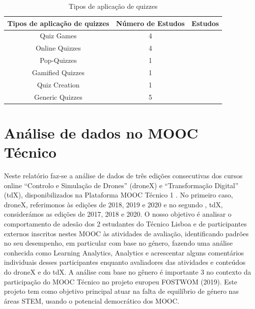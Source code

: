 \begin{table}[ht]
    \centering
        \caption{Tipos de aplicação de quizzes}
        \begin{tabular}{c|c|c}
            \hline
                \textbf{Tipos de aplicação de quizzes} & \textbf{Número de Estudos}  & \textbf{Estudos} \\
            \hline
            \hline
                Quiz Games & 
                4 &
                \cite{petri_quality_2017, petri_games_2018, verdu_distributed_2012, wu_improvement_2011} \\
            \hline
                Online Quizzes & 
                4 & 
                \cite{figueiredo_evaluation_2014, coore_facilitating_2019, luxton-reilly_introductory_2018, krugel_computational_2017} \\
            \hline
                Pop-Quizzes & 
                1 &
                \cite{luxton-reilly_introductory_2018} \\
            \hline
                Gamified Quizzes & 
                1 & 
                \cite{luxton-reilly_introductory_2018} \\
            \hline
                Quiz Creation & 
                1 & 
                \cite{ogawa_evaluation_2018} \\
            \hline
                Generic Quizzes & 
                5 & 
                \cite{crow_intelligent_2018, ogawa_evaluation_2018, acharya_infusing_2017, thevathayan_imparting_2017, herold_student_2012} \\
            \hline
        \end{tabular}
    \label{tab:quizzes_application_types}
\end{table}



\section{Análise de dados no MOOC Técnico}

Neste relatório faz-se a análise de dados de três edições consecutivas dos cursos online “Controlo e Simulação de Drones” (droneX) e “Transformação Digital” (tdX), disponibilizados na Plataforma MOOC Técnico 1 . No primeiro caso, droneX, referimonos às edições de 2018, 2019 e 2020 e no segundo , tdX, considerámos as edições de 2017, 2018 e 2020. O nosso objetivo é analisar o comportamento de adesão dos 2
estudantes do Técnico Lisboa e de participantes externos inscritos nestes MOOC às atividades de avaliação, identificando padrões no seu desempenho, em particular com base no género, fazendo uma análise conhecida como Learning Analytics, Analytics e acrescentar alguns comentários individuais desses participantes enquanto avaliadores das atividades e conteúdos do droneX e do tdX. A análise com base no gênero é importante 3 no contexto da participação do MOOC Técnico no projeto
europeu FOSTWOM (2019). Este projeto tem como objetivo principal atuar na falta de equilíbrio de género nas áreas STEM, usando o potencial democrático dos MOOC.

